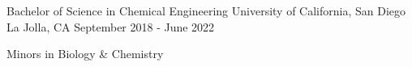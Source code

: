 \begin{cventries}

  \cventry
    {Bachelor of Science in Chemical Engineering} %
    {University of California, San Diego} %
    {La Jolla, CA} %
    {September 2018 - June 2022} %
    {
      \begin{cvitems} %
        \item {Minors in Biology \& Chemistry}
      \end{cvitems}
    }
\end{cventries}